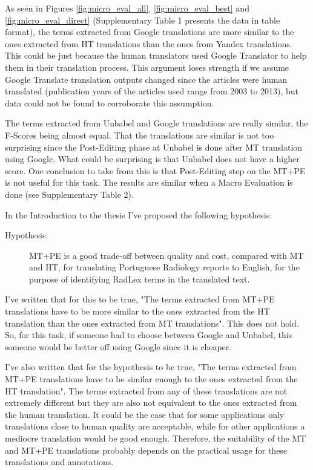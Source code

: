 As seen in Figures \ref{fig:micro_eval_all}, \ref{fig:micro_eval_best} and \ref{fig:micro_eval_direct} (Supplementary Table 1 presents the data in table format), the terms extracted from Google translations are more similar to the ones extracted from HT translations than the ones from Yandex translations. This could be just because the human translators used Google Translator to help them in their translation process. This argument loses strength if we assume Google Translate translation outputs changed since the articles were human translated (publication years of the articles used range from 2003 to 2013), but data could not be found to corroborate this assumption. 

The terms extracted from Unbabel and Google translations are really similar, the F-Scores being almost equal. That the translations are similar is not too surprising since the Post-Editing phase at Unbabel is done after MT translation using Google. What could be surprising is that Unbabel does not have a higher score. One conclusion to take from this is that Post-Editing step on the MT+PE is not useful for this task. The results are similar when a Macro Evaluation is done (see Supplementary Table 2).

In the Introduction to the thesis I've proposed the following hypothesis:

\begin{description}
	\item[Hypothesis:] MT+PE is a good trade-off between quality and cost, compared with MT and HT, for translating Portuguese Radiology reports to English, for the purpose of identifying RadLex terms in the translated text. 
\end{description}

I've written that for this to be true, "The terms extracted from MT+PE translations have to be more similar to the ones extracted from the HT translation than the ones extracted from MT translations". This does not hold. So, for this task, if someone had to choose between Google and Unbabel, this someone would be better off using Google since it is cheaper. 

I've also written that for the hypothesis to be true, "The terms extracted from MT+PE translations have to be similar enough to the ones extracted from the HT translation". The terms extracted from any of these translations are not extremely different but they are also not equivalent to the ones extracted from the human translation. It could be the case that for some applications only translations close to human quality are acceptable, while for other applications a mediocre translation would be good enough. Therefore, the suitability of the MT and MT+PE translations probably depends on the practical usage for these translations and annotations. 

